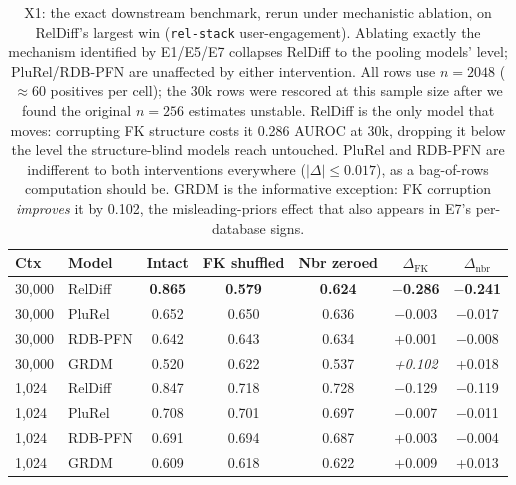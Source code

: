 \documentclass{article}
\begin{document}
\begin{table}[t]
\caption{X1: the exact downstream benchmark, rerun under mechanistic ablation, on RelDiff's largest win (\texttt{rel-stack} user-engagement). Ablating exactly the mechanism identified by E1/E5/E7 collapses RelDiff to the pooling models' level; PluRel/RDB-PFN are unaffected by either intervention. All rows use $n{=}2048$ ($\approx$60 positives per cell); the 30k rows were rescored at this sample size after we found the original $n{=}256$ estimates unstable. RelDiff is the only model that moves: corrupting FK structure costs it 0.286 AUROC at 30k, dropping it below the level the structure-blind models reach untouched. PluRel and RDB-PFN are indifferent to both interventions everywhere ($|\Delta| \leq 0.017$), as a bag-of-rows computation should be. GRDM is the informative exception: FK corruption \emph{improves} it by 0.102, the misleading-priors effect that also appears in E7's per-database signs.}
\label{tab:x1}
\centering
\small
\begin{tabular}{llccccc}
\toprule
Ctx & Model & Intact & FK shuffled & Nbr zeroed & $\Delta_{\text{FK}}$ & $\Delta_{\text{nbr}}$ \\
\midrule
30{,}000 & RelDiff  & \textbf{0.865} & \textbf{0.579} & \textbf{0.624} & \textbf{$-$0.286} & \textbf{$-$0.241} \\
30{,}000 & PluRel   & 0.652 & 0.650 & 0.636 & $-$0.003 & $-$0.017 \\
30{,}000 & RDB-PFN  & 0.642 & 0.643 & 0.634 & +0.001 & $-$0.008 \\
30{,}000 & GRDM     & 0.520 & 0.622 & 0.537 & \emph{+0.102} & +0.018 \\
1{,}024  & RelDiff  & 0.847 & 0.718 & 0.728 & $-$0.129 & $-$0.119 \\
1{,}024  & PluRel   & 0.708 & 0.701 & 0.697 & $-$0.007 & $-$0.011 \\
1{,}024  & RDB-PFN  & 0.691 & 0.694 & 0.687 & +0.003 & $-$0.004 \\
1{,}024  & GRDM     & 0.609 & 0.618 & 0.622 & +0.009 & +0.013 \\
\bottomrule
\end{tabular}
\end{table}
\end{document}

